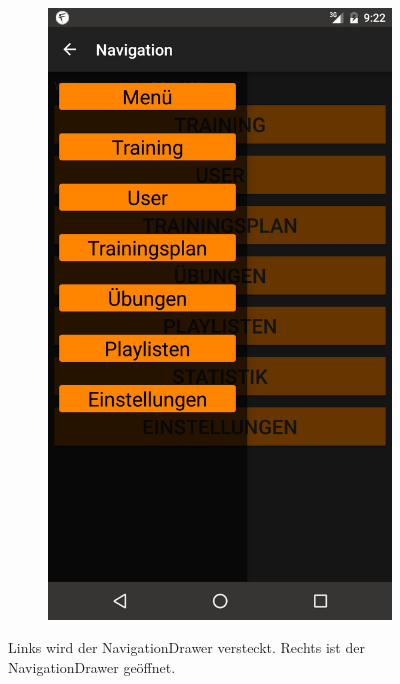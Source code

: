 \documentclass[FIPLY_base.tex]{subfiles}
\begin{document}
\begin{figure}[h]
\begin{subfigure}[b]{0.3\textwidth}
	\end{subfigure}
	\hfil
	\begin{subfigure}[b]{0.3\textwidth}
	\includegraphics[scale=0.15]{img/NavDrawerOpened}
	\end{subfigure}
	\caption{Links wird der NavigationDrawer versteckt. Rechts ist der NavigationDrawer geöffnet.}
\end{figure}
\end{document}
